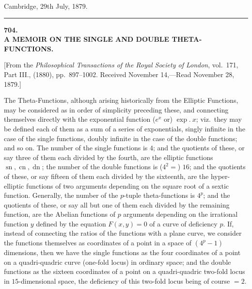 \documentclass[11pt]{article}
\begin{document}
\medskip
\hfill Cambridge, 29th July, 1879.

\bigskip\bigskip
\hrule
\bigskip

\begin{center}
\textbf{\large 704.}\\[4pt]
\textbf{A MEMOIR ON THE SINGLE AND DOUBLE THETA-FUNCTIONS.}
\end{center}

\medskip

\noindent\small [From the \textit{Philosophical Transactions of the Royal Society of London}, vol.\ 171, Part III., (1880), pp.\ 897--1002. Received November 14,---Read November 28, 1879.]\normalsize

\bigskip

The Theta-Functions, although arising historically from the Elliptic Functions, may be considered as in order of simplicity preceding these, and connecting themselves directly with the exponential function ($e^x$ or) $\exp.\ x$; viz.\ they may be defined each of them as a sum of a series of exponentials, singly infinite in the case of the single functions, doubly infinite in the case of the double functions; and so on. The number of the single functions is $4$; and the quotients of these, or say three of them each divided by the fourth, are the elliptic functions $\operatorname{sn},\operatorname{cn},\operatorname{dn}$; the number of the double functions is ($4^2 =$) $16$; and the quotients of these, or say fifteen of them each divided by the sixteenth, are the hyper-elliptic functions of two arguments depending on the square root of a sextic function. Generally, the number of the $p$-tuple theta-functions is $4^p$; and the quotients of these, or say all but one of them each divided by the remaining function, are the Abelian functions of $p$ arguments depending on the irrational function $y$ defined by the equation $F(x,y) = 0$ of a curve of deficiency $p$. If, instead of connecting the ratios of the functions with a plane curve, we consider the functions themselves as coordinates of a point in a space of $(4^p - 1)$ dimensions, then we have the single functions as the four coordinates of a point on a quadri-quadric curve (one-fold locus) in ordinary space; and the double functions as the sixteen coordinates of a point on a quadri-quadric two-fold locus in $15$-dimensional space, the deficiency of this two-fold locus being of course $= 2$.
\end{document}
